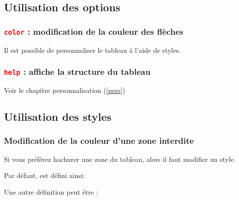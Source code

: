 \subsection{Utilisation des options}

\subsubsection{\texttt{\textcolor{red}{color}} : modification de la couleur des flèches}
Il est possible de personnaliser le tableau à l'aide de styles.
\begin{tkzexample}
\end{tkzexample}

\subsubsection{\texttt{\textcolor{red}{help}} : affiche la structure du tableau}
Voir le chapitre personnalisation (\ref{pers})
\subsection{Utilisation des styles}

\subsubsection{Modification de la couleur d'une zone interdite}
Si vous préférez hachurer une zone du tableau, alors  il faut modifier un style.

Par défaut,   est défini ainsi:
\begin{tkzexample}
\end{tkzexample}

Une autre définition peut être :

\begin{tkzexample}
\end{tkzexample}

